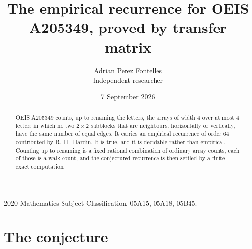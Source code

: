 \documentclass[11pt,a4paper]{article}
\title{The empirical recurrence for OEIS A205349, proved by transfer matrix}
\author{Adrian Perez Fontelles\\ \small Independent researcher}
\date{7 September 2026}
\theoremstyle{plain}
\theoremstyle{definition}
\begin{document}
\maketitle

\begin{abstract}
OEIS A205349 counts, up to renaming the letters, the arrays of width $4$ over at most $4$
letters in which no two $2\times2$ subblocks that are neighbours, horizontally or vertically, have the same number of equal edges. It carries an empirical recurrence of order $64$ contributed by
R.~H.~Hardin. It is true, and it is decidable rather than empirical. Counting up to renaming is
a fixed rational combination of ordinary array counts, each of those is a walk count, and the
conjectured recurrence is then settled by a finite exact computation.
\end{abstract}

\noindent\small 2020 Mathematics Subject Classification. 05A15, 05A18, 05B45.\normalsize

\section{The conjecture}
\end{document}
